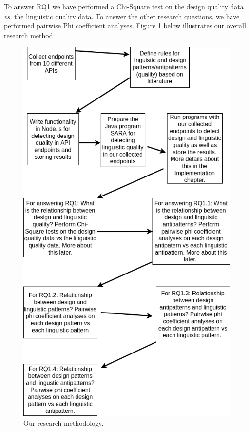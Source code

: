 \documentclass[a4paper,12pt]{article}
\begin{document}
To answer RQ1 we have performed a Chi-Square test on the design quality data \textit{vs.} the linguistic quality data. To answer the other research questions, we have performed pairwise Phi coefficient analyses. Figure \ref{fig:Method figure} below illustrates our overall research method. 

\begin{figure}[ht!]
    \centering
    \includegraphics[scale=0.5]{Template_report_LaTeX_EN/img/method_figures/method_figure.png}
    \caption{Our research methodology.}
    \label{fig:Method figure}
\end{figure}
\end{document}
